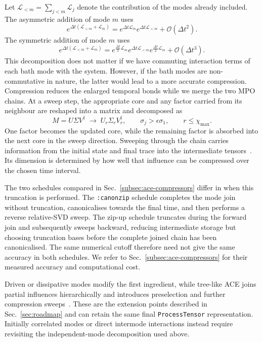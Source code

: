 Let $\mathcal L_{<m}=\sum_{j<m}\mathcal L_j$ denote the contribution of the modes already included. 
The asymmetric addition of mode $m$ uses
%
\begin{equation}
    e^{\Delta t(\mathcal L_{<m}+\mathcal L_m)}
    = e^{\Delta t\mathcal L_m}
      e^{\Delta t\mathcal L_{<m}}
      +\mathcal O(\Delta t^2).
    \label{eq:ace-symmetric-split}
\end{equation}
%
The symmetric addition of mode $m$ uses
%
\begin{equation}
    e^{\Delta t(\mathcal L_{<m}+\mathcal L_m)}
    = e^{\frac{\Delta t}{2}\mathcal L_m}
      e^{\Delta t\mathcal L_{<m}}
      e^{\frac{\Delta t}{2}\mathcal L_m}
      +\mathcal O(\Delta t^3).
    \label{eq:ace-symmetric-split}
\end{equation}
%
This decomposition does not matter if we have commuting interaction terms of each bath mode with the system. 
However, if the bath modes are non-commutative in nature, the latter would lead to a more accurate compression. 
Compression reduces the enlarged temporal bonds while we merge the two MPO chains. 
At a sweep step, the appropriate core and any factor carried from its neighbour are reshaped into a matrix and decomposed as
%
\begin{equation}
    M=U\Sigma V^\dagger
    \;\longrightarrow\;
    U_r\Sigma_rV_r^\dagger,
    \qquad
    \sigma_j>\epsilon\sigma_1,\qquad r\leq\chi_{\max}.
    \label{eq:ace-appendix-svd}
\end{equation}
%
One factor becomes the updated core, while the remaining factor is absorbed into the next core in the sweep direction. 
Sweeping through the chain carries information from the initial state and final trace into the intermediate tensors~\cite{Cygorek2022}. 
Its dimension is determined by how well that influence can be compressed over the chosen time interval. 

The two schedules compared in Sec.~\ref{subsec:ace-compressors} differ in when this truncation is performed. The \texttt{:canonzip} schedule completes the mode join without truncation, canonicalises towards the final time, and then performs a reverse relative-SVD sweep. 
The zip-up schedule truncates during the forward join and subsequently sweeps backward, reducing intermediate storage but choosing truncation bases before the complete joined chain has been canonicalised. 
The same numerical cutoff therefore need not give the same accuracy in both schedules. 
We refer to Sec.~\ref{subsec:ace-compressors} for their measured accuracy and computational cost. 

Driven or dissipative modes modify the first ingredient, while tree-like ACE joins partial influences hierarchically and introduces preselection and further compression sweeps~\cite{Cygorek2024Treelike}.
These are the extension points described in Sec.~\ref{sec:roadmap} and can retain the same final \texttt{ProcessTensor} representation.
Initially correlated modes or direct intermode interactions instead require revisiting the independent-mode decomposition used above.
